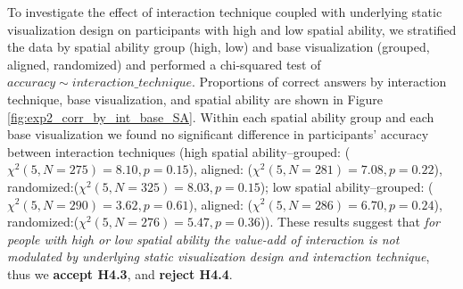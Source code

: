 To investigate the effect of interaction technique coupled with underlying static visualization design on participants with high and low spatial ability, we stratified the data by spatial ability group (high, low) and base visualization (grouped, aligned, randomized) and performed a chi-squared test of $accuracy \sim interaction\_technique$.
Proportions of correct answers by interaction technique, base visualization, and spatial ability are shown in Figure \ref{fig:exp2_corr_by_int_base_SA}. 
Within each spatial ability group and each base visualization we found no significant difference in participants' accuracy between interaction techniques (high spatial ability--grouped: ($\chi^2(5, N = 275) = 8.10, p = 0.15$), aligned: ($\chi^2(5, N = 281) = 7.08, p = 0.22$), randomized:($\chi^2(5, N = 325) = 8.03, p = 0.15$); low spatial ability--grouped: ($\chi^2(5, N = 290) = 3.62, p = 0.61$), aligned: ($\chi^2(5, N = 286) = 6.70, p = 0.24$), randomized:($\chi^2(5, N = 276) = 5.47, p = 0.36$)). These results suggest that \textit{for people with high or low spatial ability the value-add of interaction is not modulated by underlying static visualization design and interaction technique}, thus we \textbf{accept H4.3}, and \textbf{reject H4.4}.  

